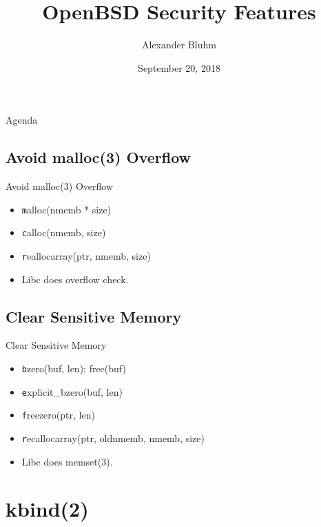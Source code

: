 \documentclass[14pt]{beamer}
\author{Alexander Bluhm}
\title{OpenBSD Security Features}
\institute{genua GmbH\\ \url{bluhm@genua.de}\\ \url{bluhm@openbsd.org}}
\date{September 20, 2018}
\begin{document}
\begin{frame}
\titlepage
\end{frame}

\begin{frame}{Agenda}
\setcounter{tocdepth}{1}
\tableofcontents
\end{frame}

\subsection{Avoid malloc(3) Overflow}
\begin{frame}{Avoid malloc(3) Overflow}
\begin{itemize}
    \item {\texttt malloc(nmemb * size)}
    \item {\texttt calloc(nmemb, size)}
    \item {\texttt reallocarray(ptr, nmemb, size)}
    \item Libc does overflow check.
\end{itemize}
\end{frame}

\subsection{Clear Sensitive Memory}
\begin{frame}{Clear Sensitive Memory}
\begin{itemize}
    \item {\texttt bzero(buf, len); free(buf)}
    \item {\texttt explicit\_bzero(buf, len)}
    \item {\texttt freezero(ptr, len)}
    \item {\texttt recallocarray(ptr, oldnmemb, nmemb, size)}
    \item Libc does memset(3).
\end{itemize}
\end{frame}


\section{kbind(2)}
\end{document}
